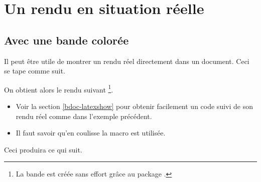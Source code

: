 

\usepackage[lang = french]{../main/main}
\usepackage{../macroenv/macroenv}
\usepackage{../listing/listing}
\usepackage{../focus/focus}


\usepackage{showcase}




\section{Un rendu en situation réelle}

\subsection{Avec une bande colorée}

\begin{bdocexa} 
    Il peut être utile de montrer un rendu réel directement dans un document.
    Ceci se tape comme suit.
    
    
	On obtient alors le rendu suivant
	\footnote{
    	La bande est créée sans effort grâce au package .
	}.

	\medskip
	
	
\end{bdocexa}


\begin{bdocrem}
	\leavevmode
	
	\begin{itemize}
	    \item Voir la section \ref{bdoc-latexshow} pour obtenir facilement un code suivi de son rendu réel comme dans l'exemple précédent.
	    
	    \item Il faut savoir qu'en coulisse la macro  est utilisée.
	\end{itemize}

    \begin{bdoclatex}[std]
	\end{bdoclatex}
\end{bdocrem}




\begin{bdocexa}
	\leavevmode


	Ceci produira ce qui suit.

	\medskip
	
	
\end{bdocexa}



